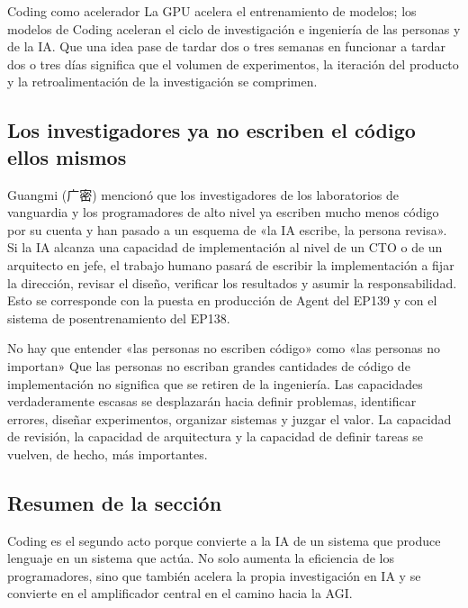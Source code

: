 \begin{importantbox}{Coding como acelerador}
La GPU acelera el entrenamiento de modelos; los modelos de Coding aceleran el ciclo de investigación e ingeniería de las personas y de la IA. Que una idea pase de tardar dos o tres semanas en funcionar a tardar dos o tres días significa que el volumen de experimentos, la iteración del producto y la retroalimentación de la investigación se comprimen.
\end{importantbox}

\subsection{Los investigadores ya no escriben el código ellos mismos}

Guangmi (广密) mencionó que los investigadores de los laboratorios de vanguardia y los programadores de alto nivel ya escriben mucho menos código por su cuenta y han pasado a un esquema de «la IA escribe, la persona revisa». Si la IA alcanza una capacidad de implementación al nivel de un CTO o de un arquitecto en jefe, el trabajo humano pasará de escribir la implementación a fijar la dirección, revisar el diseño, verificar los resultados y asumir la responsabilidad. Esto se corresponde con la puesta en producción de Agent del EP139 y con el sistema de posentrenamiento del EP138.

\begin{warningbox}{No hay que entender «las personas no escriben código» como «las personas no importan»}
Que las personas no escriban grandes cantidades de código de implementación no significa que se retiren de la ingeniería. Las capacidades verdaderamente escasas se desplazarán hacia definir problemas, identificar errores, diseñar experimentos, organizar sistemas y juzgar el valor. La capacidad de revisión, la capacidad de arquitectura y la capacidad de definir tareas se vuelven, de hecho, más importantes.
\end{warningbox}

\subsection{Resumen de la sección}

Coding es el segundo acto porque convierte a la IA de un sistema que produce lenguaje en un sistema que actúa. No solo aumenta la eficiencia de los programadores, sino que también acelera la propia investigación en IA y se convierte en el amplificador central en el camino hacia la AGI.
